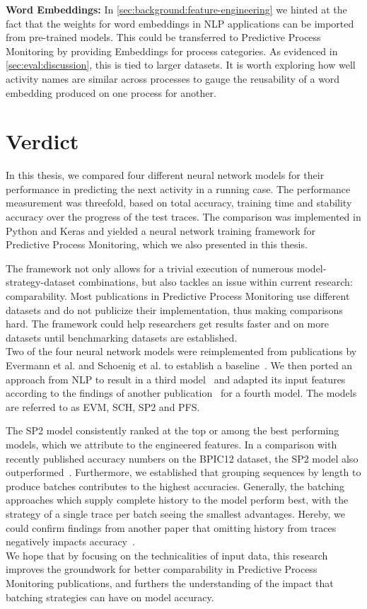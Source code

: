 \noindent\textbf{Word Embeddings:} In \autoref{sec:background:feature-engineering} we hinted at the fact that the weights for word embeddings in NLP applications can be imported from pre-trained models. This could be transferred to Predictive Process Monitoring by providing Embeddings for process categories. As evidenced in \autoref{sec:eval:discussion}, this is tied to larger datasets. It is worth exploring how well activity names are similar across processes to gauge the reusability of a word embedding produced on one process for another.

\section{Verdict} \label{sec:conclusion:verdict}
In this thesis, we compared four different neural network models for their performance in predicting the next activity in a running case. The performance measurement was threefold, based on total accuracy, training time and stability accuracy over the progress of the test traces. The comparison was implemented in Python and Keras and yielded a neural network training framework for Predictive Process Monitoring, which we also presented in this thesis.

The framework not only allows for a trivial execution of numerous model-strategy-dataset combinations, but also tackles an issue within current research: comparability. Most publications in Predictive Process Monitoring use different datasets and do not publicize their implementation, thus making comparisons hard. The framework could help researchers get results faster and on more datasets until benchmarking datasets are established.\\

Two of the four neural network models were reimplemented from publications by Evermann et al. and Schoenig et al. to establish a baseline~\cite{evermann2016, schoenig2018}. We then ported an approach from NLP to result in a third model~\cite{shibata2016bipartite} and adapted its input features according to the findings of another publication~\cite{klinkmuller2018reliablemonitoring} for a fourth model. The models are referred to as EVM, SCH, SP2 and PFS.

The SP2 model consistently ranked at the top or among the best performing models, which we attribute to the engineered features. In a comparison with recently published accuracy numbers on the BPIC12 dataset, the SP2 model also outperformed~\cite{boehmer2018probability, evermann2016}. Furthermore, we established that grouping sequences by length to produce batches contributes to the highest accuracies. Generally, the batching approaches which supply complete history to the model perform best, with the strategy of a single trace per batch seeing the smallest advantages. Hereby, we could confirm findings from another paper that omitting history from traces negatively impacts accuracy~\cite{klinkmuller2018reliablemonitoring}.\\

We hope that by focusing on the technicalities of input data, this research improves the groundwork for better comparability in Predictive Process Monitoring publications, and furthers the understanding of the impact that batching strategies can have on model accuracy.
